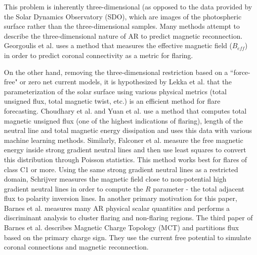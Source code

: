 This problem is inherently three-dimensional (as opposed to the data provided by the Solar Dynamics Observatory (SDO), which are images of the photospheric surface rather than the three-dimensional samples. Many methods attempt to describe the three-dimensional nature of AR to predict magnetic reconnection. Georgoulis et al. \cite{georgoulis_rust_2007} uses a method that measures the effective magnetic field ($B_{eff}$) in order to predict coronal connectivity as a metric for flaring.

On the other hand, removing the three-dimensional restriction based on a ``force-free" or zero net current models, it is hypothesized by Lekka et al. \cite{Properties1} that the parameterization of the solar surface using various physical metrics (total unsigned flux, total magnetic twist, etc.) is an efficient method for flare forecasting. Choudhary et al. \cite{choudhary_strassmeier_2011} and Yuan et al. \cite{yuan_shih_jing_wang_2010} use a method that computes total magnetic unsigned flux (one of the highest indications of flaring), length of the neutral line and total magnetic energy dissipation and uses this data with various machine learning methods. Similarly, Falconer et al. \cite{falconer_moore_gary_2008} measure the free magnetic energy inside strong gradient neutral lines and then use least squares to convert this distribution through Poisson statistics. This method works best for flares of class C1 or more. Using the same strong gradient neutral lines as a restricted domain, Schrijver \cite{schrijver} measures the magnetic field close to non-potential high gradient neutral lines in order to compute the $R$ parameter - the total adjacent flux to polarity inversion lines. In another primary motivation for this paper, Barnes et al. \cite{Properties1} measures many AR physical scalar quantities and performs a discriminant analysis to cluster flaring and non-flaring regions. The third paper of Barnes et al. \cite{Properties3} describes Magnetic Charge Topology (MCT) and partitions flux based on the primary charge sign. They use the current free potential to simulate coronal connections and magnetic reconnection.

